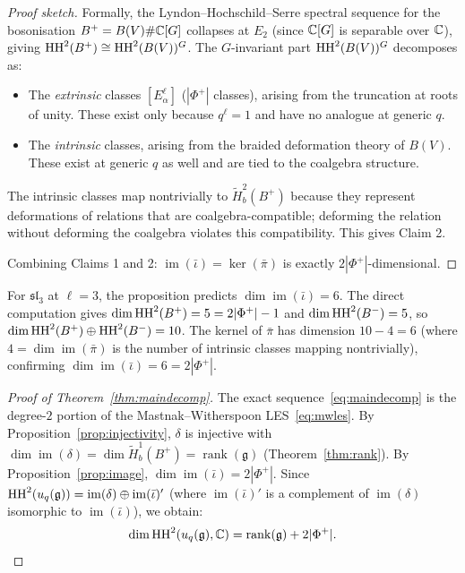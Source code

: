 \begin{proof}[Proof sketch]
Formally, the Lyndon--Hochschild--Serre spectral sequence for the bosonisation $B^+ = B(V) \# \mathbb{C}[G]$ collapses at $E_2$ (since $\mathbb{C}[G]$ is separable over $\mathbb{C}$), giving $\operatorname{HH}^2(B^+) \cong \operatorname{HH}^2(B(V))^G$. The $G$-invariant part $\operatorname{HH}^2(B(V))^G$ decomposes as:
\begin{itemize}
\item The \emph{extrinsic} classes $[E_\alpha^\ell]$ ($|\Phi^+|$ classes), arising from the truncation at roots of unity. These exist only because $q^\ell = 1$ and have no analogue at generic $q$.
\item The \emph{intrinsic} classes, arising from the braided deformation theory of $B(V)$. These exist at generic $q$ as well and are tied to the coalgebra structure.
\end{itemize}
The intrinsic classes map nontrivially to $\tilde{H}^2_b(B^+)$ because they represent deformations of relations that are coalgebra-compatible; deforming the relation without deforming the coalgebra violates this compatibility. This gives Claim 2.

Combining Claims 1 and 2: $\operatorname{im}(\bar\iota) = \ker(\bar\pi)$ is exactly $2|\Phi^+|$-dimensional.
\end{proof}

\begin{remark}
For $\mathfrak{sl}_3$ at $\ell = 3$, the proposition predicts $\dim \operatorname{im}(\bar\iota) = 6$. The direct computation gives $\dim \operatorname{HH}^2(B^+) = 5 = 2|\Phi^+| - 1$ and $\dim \operatorname{HH}^2(B^-) = 5$, so $\dim \operatorname{HH}^2(B^+) \oplus \operatorname{HH}^2(B^-) = 10$. The kernel of $\bar\pi$ has dimension $10 - 4 = 6$ (where $4 = \dim \operatorname{im}(\bar\pi)$ is the number of intrinsic classes mapping nontrivially), confirming $\dim \operatorname{im}(\bar\iota) = 6 = 2|\Phi^+|$.
\end{remark}

\begin{proof}[Proof of Theorem~\ref{thm:maindecomp}]
The exact sequence~\eqref{eq:maindecomp} is the degree-$2$ portion of the Mastnak--Witherspoon LES~\eqref{eq:mwles}. By Proposition~\ref{prop:injectivity}, $\delta$ is injective with $\dim \operatorname{im}(\delta) = \dim \tilde{H}^1_b(B^+) = \operatorname{rank}(\mathfrak{g})$ (Theorem~\ref{thm:rank}). By Proposition~\ref{prop:image}, $\dim \operatorname{im}(\bar\iota) = 2|\Phi^+|$. Since $\operatorname{HH}^2(u_q(\mathfrak{g})) = \operatorname{im}(\delta) \oplus \operatorname{im}(\bar\iota)'$ (where $\operatorname{im}(\bar\iota)'$ is a complement of $\operatorname{im}(\delta)$ isomorphic to $\operatorname{im}(\bar\iota)$), we obtain:
\[
\dim \operatorname{HH}^2(u_q(\mathfrak{g}), \mathbb{C}) = \operatorname{rank}(\mathfrak{g}) + 2|\Phi^+|. \qedhere
\]
\end{proof}

